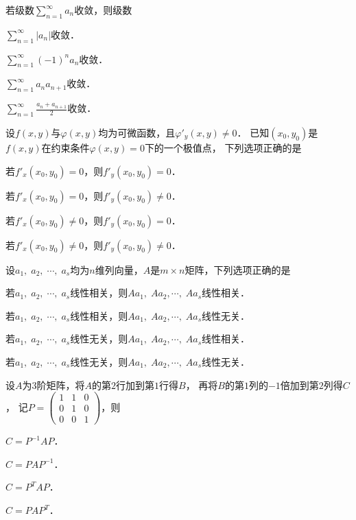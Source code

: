 \documentclass[plain,noanswer,medmath]{../../template/jnuexam}
\begin{document}
\begin{problem}
若级数$\sum_{n = 1}^{\infty}a_n$收敛，则级数\pickout{}
\begin{abcd}
\item $\sum_{n = 1}^{\infty}\left| a_n \right|$收敛．
\item $\sum_{n = 1}^{\infty}(- 1)^n a_n$收敛．
\item $\sum_{n = 1}^{\infty}a_n a_{n + 1}$收敛．
\item $\sum_{n = 1}^{\infty}\frac{a_n + a_{n + 1}}{2}$收敛．
\end{abcd}
\end{problem}


\begin{problem}
设$f(x,y)$与$\varphi(x,y)$均为可微函数，且$\varphi'_y(x,y) \ne 0$．
已知$(x_0,y_0)$是$f(x,y)$在约束条件$\varphi (x,y) = 0$下的一个极值点，
下列选项正确的是\pickout{}
\begin{abcd}
\item 若$f'_x(x_0,y_0) = 0$，则$f'_y(x_0,y_0) = 0$．
\item 若$f'_x(x_0,y_0) = 0$，则$f'_y(x_0,y_0) \ne 0$．
\item 若$f'_x(x_0,y_0) \ne 0$，则$f'_y(x_0,y_0) = 0$．
\item 若$f'_x(x_0,y_0) \ne 0$，则$f'_y(x_0,y_0) \ne 0$．
\end{abcd}
\end{problem}


\begin{problem}
设$a_1,\;a_2,\; \cdots ,\;a_s$均为$n$维列向量，$A$是$m \times n$矩阵，下列选项正确的是\pickout{}
\begin{abcd}
\item 若$a_1,\;a_2,\; \cdots ,\;a_s$线性相关，则$Aa_1,\;Aa_2, \cdots ,\;Aa_s$线性相关．
\item 若$a_1,\;a_2,\; \cdots ,\;a_s$线性相关，则$Aa_1,\;Aa_2, \cdots ,\;Aa_s$线性无关．
\item 若$a_1,\;a_2,\; \cdots ,\;a_s$线性无关，则$Aa_1,\;Aa_2, \cdots ,\;Aa_s$线性相关．
\item 若$a_1,\;a_2,\; \cdots ,\;a_s$线性无关，则$Aa_1,\;Aa_2, \cdots ,\;Aa_s$线性无关．
\end{abcd}
\end{problem}


\begin{problem}
设$A$为$3$阶矩阵，将$A$的第$2$行加到第$1$行得$B$，
再将$B$的第$1$列的$- 1$倍加到第$2$列得$C$，
记$P = \begin{pmatrix}
  1 & 1 & 0 \\
  0 & 1 & 0 \\
  0 & 0 & 1
\end{pmatrix}$，则\pickout{}
\begin{abcd}
\item $C = P^{-1} AP$．
\item $C = PA P^{-1}$．
\item $C = P^T AP$．
\item $C = PA P^T$．
\end{abcd}
\end{problem}
\end{document}
